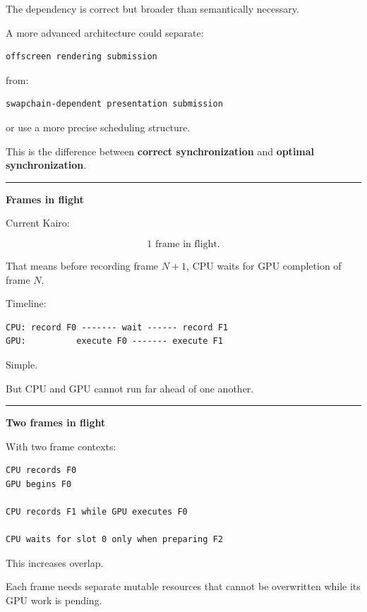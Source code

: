 The dependency is correct but broader than semantically necessary.

A more advanced architecture could separate:

\begin{verbatim}
offscreen rendering submission
\end{verbatim}

from:

\begin{verbatim}
swapchain-dependent presentation submission
\end{verbatim}

or use a more precise scheduling structure.

This is the difference between \textbf{correct synchronization} and \textbf{optimal synchronization}.

\begin{center}\rule{0.5\linewidth}{0.5pt}\end{center}

\textbf{Frames in flight}

Current Kairo:

\[
\boxed{1\text{ frame in flight}.}
\]

That means before recording frame \(N+1\), CPU waits for GPU completion of frame \(N\).

Timeline:

\begin{verbatim}
CPU: record F0 ------- wait ------ record F1
GPU:          execute F0 ------- execute F1
\end{verbatim}

Simple.

But CPU and GPU cannot run far ahead of one another.

\begin{center}\rule{0.5\linewidth}{0.5pt}\end{center}

\textbf{Two frames in flight}

With two frame contexts:

\begin{verbatim}
CPU records F0
GPU begins F0

CPU records F1 while GPU executes F0

CPU waits for slot 0 only when preparing F2
\end{verbatim}

This increases overlap.

Each frame needs separate mutable resources that cannot be overwritten while its GPU work is pending.

